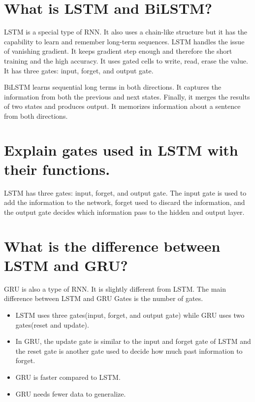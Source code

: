 \documentclass[
]{book}
\begin{document}
\hypertarget{what-is-lstm-and-bilstm}{%
\section{What is LSTM and BiLSTM?}\label{what-is-lstm-and-bilstm}}

LSTM is a special type of RNN. It also uses a chain-like structure but it has the capability to learn and remember long-term sequences. LSTM handles the issue of vanishing gradient. It keeps gradient step enough and therefore the short training and the high accuracy. It uses gated cells to write, read, erase the value. It has three gates: input, forget, and output gate.

BiLSTM learns sequential long terms in both directions. It captures the information from both the previous and next states. Finally, it merges the results of two states and produces output. It memorizes information about a sentence from both directions.

\hypertarget{explain-gates-used-in-lstm-with-their-functions.}{%
\section{Explain gates used in LSTM with their functions.}\label{explain-gates-used-in-lstm-with-their-functions.}}

LSTM has three gates: input, forget, and output gate. The input gate is used to add the information to the network, forget used to discard the information, and the output gate decides which information pass to the hidden and output layer.

\hypertarget{what-is-the-difference-between-lstm-and-gru}{%
\section{What is the difference between LSTM and GRU?}\label{what-is-the-difference-between-lstm-and-gru}}

GRU is also a type of RNN. It is slightly different from LSTM. The main difference between LSTM and GRU Gates is the number of gates.

\begin{itemize}
\item
  LSTM uses three gates(input, forget, and output gate) while GRU uses two gates(reset and update).
\item
  In GRU, the update gate is similar to the input and forget gate of LSTM and the reset gate is another gate used to decide how much past information to forget.
\item
  GRU is faster compared to LSTM.
\item
  GRU needs fewer data to generalize.
\end{itemize}
\end{document}
